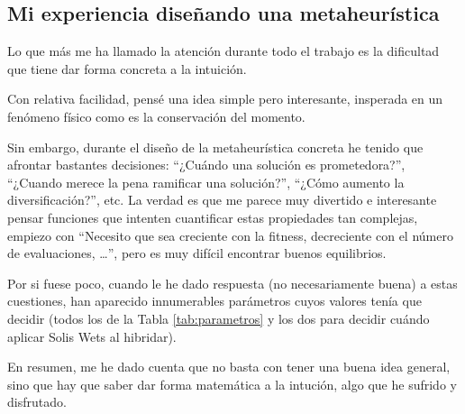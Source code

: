 \documentclass{article}
\begin{document}
\subsection{Mi experiencia diseñando una metaheurística}

Lo que más me ha llamado la atención durante todo el trabajo es la dificultad que tiene dar forma concreta a la intuición.

Con relativa facilidad, pensé una idea simple pero interesante, insperada en un fenómeno físico como es la conservación del momento.

Sin embargo, durante el diseño de la metaheurística concreta he tenido que afrontar bastantes decisiones: ``¿Cuándo una solución es prometedora?'', ``¿Cuando merece la pena ramificar una solución?'', ``¿Cómo aumento la diversificación?'', etc. La verdad es que me parece muy divertido e interesante pensar
 funciones que intenten cuantificar estas propiedades tan complejas, empiezo con ``Necesito que sea creciente con la fitness, decreciente
 con el número de evaluaciones, \ldots'', pero es muy difícil encontrar buenos equilibrios.

Por si fuese poco, cuando le he dado respuesta (no necesariamente buena) a estas cuestiones, han aparecido innumerables parámetros cuyos
valores tenía que decidir (todos los de la Tabla \ref{tab:parametros} y los dos para decidir cuándo aplicar Solis Wets al hibridar).

En resumen, me he dado cuenta que no basta con tener una buena idea general, sino que hay que saber dar forma matemática a la intución,
algo que he sufrido y disfrutado.
\end{document}
